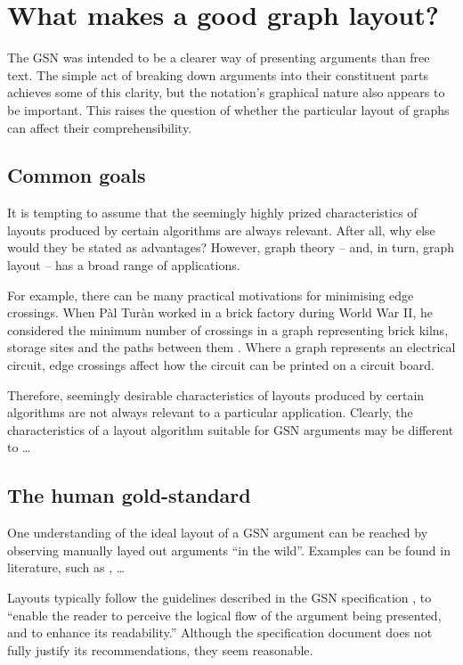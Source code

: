 \section{What makes a good graph layout?}

The GSN was intended to be a clearer way of presenting arguments than free text.
The simple act of breaking down arguments into their constituent parts achieves some of this clarity,
but the notation's graphical nature also appears to be important.
This raises the question of whether the particular layout of graphs can affect their comprehensibility.

\subsection{Common goals}

It is tempting to assume that the seemingly highly prized characteristics of layouts produced by certain algorithms are always relevant. After all, why else would they be stated as advantages? However, graph theory -- and, in turn, graph layout -- has a broad range of applications. 

For example, there can be many practical motivations for minimising edge crossings.
When P\`{a}l Tur\`{a}n worked in a brick factory during World War II,
he considered the minimum number of crossings in a graph representing
brick kilns, storage sites and the paths between them .
Where a graph represents an electrical circuit, edge crossings affect how the circuit can be printed on a circuit board.

Therefore, seemingly desirable characteristics of layouts produced by certain algorithms are not always relevant to a particular application.
Clearly, the characteristics of a layout algorithm suitable for GSN arguments may be different to \ldots

\subsection{The human gold-standard }

One understanding of the ideal layout of a GSN argument can be reached by observing manually layed out arguments ``in the wild''.
Examples can be found in literature, such as \citet{insilico}, \citet{Habli:2006:PPC:1183088.1183090} \ldots

Layouts typically follow the guidelines described in the GSN specification \citep[section~2.2, pp.~26--27]{gsnstandard}, to ``enable the reader to perceive the logical flow of the argument being presented, and to enhance its readability.''
Although the specification document does not fully justify its recommendations, they seem reasonable.


